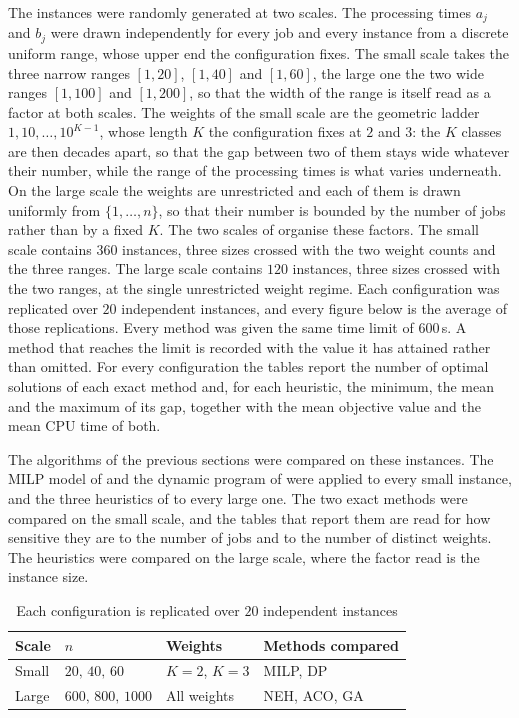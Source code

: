\documentclass[12pt]{article}
\newlength{\resultstabwidth}
\newcommand{\resultstable}{%
    \centering
    \footnotesize
    \setlength{\tabcolsep}{4pt}%
    \renewcommand{\arraystretch}{1.15}}
\begin{document}
\begin{sloppypar}
The instances were randomly generated at two scales. The processing times $a_j$ and $b_j$
were drawn independently for every job and every instance from a discrete uniform range,
whose upper end the configuration fixes. The small scale takes the three narrow ranges
$[1,20]$, $[1,40]$ and $[1,60]$, the large one the two wide ranges $[1,100]$ and $[1,200]$,
so that the width of the range is itself read as a factor at both scales. The weights of the
small scale are the geometric
ladder $1,10,\dots,10^{K-1}$, whose length $K$ the configuration fixes at $2$ and $3$: the
$K$ classes are then decades apart, so that the gap between two of them stays wide whatever
their number, while the range of the processing times is what varies underneath. On the large
scale the weights are
unrestricted and each of them is drawn uniformly from $\{1,\dots,n\}$, so that their number
is bounded by the number of jobs rather than by a fixed $K$. The two scales of
 organise these factors. The small scale contains $360$ instances, three
sizes crossed with the two weight counts and the three ranges. The large scale contains $120$
instances, three sizes crossed with the two ranges, at the single unrestricted weight
regime. Each configuration was replicated over $20$ independent instances, and
every figure below is the average of those replications. Every method was given the same
time limit of $600$\,s. A method that reaches the limit is recorded with the value it has
attained rather than omitted. For every configuration the tables report the number of optimal
solutions of each exact method and, for each heuristic, the minimum, the mean and the maximum
of its gap, together with the mean objective value and the mean CPU time of both.

The algorithms of the previous sections were compared on these instances. The MILP model of
 and the dynamic program of  were applied to every small
instance, and the three heuristics of  to every large one.
The two exact methods were compared on the small scale, and the tables that report them are
read for how sensitive they are to the number of jobs and to the number of distinct weights.
The heuristics were compared on the large scale, where the factor read is the instance size.

\begin{table}[H]
\resultstable
\caption{Each configuration is replicated over $20$ independent instances}
\label{tab:instances}
\begin{tabular*}{\resultstabwidth}{@{\extracolsep{\fill}
}llll@{}}
\toprule
Scale  & $n$                & Weights                   & Methods compared \\
\midrule
Small  & $20,\,40,\,60$        & $K=2$, $K=3$              & MILP, DP \\
Large  & $600,\,800,\,1000$   & All weights               & NEH, ACO, GA \\
\bottomrule
\end{tabular*}
\end{table}


\end{sloppypar}
\end{document}

